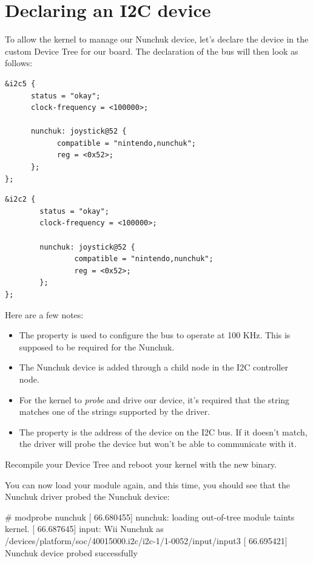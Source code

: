 \section{Declaring an I2C device}

To allow the kernel to manage our Nunchuk device, let's declare the
device in the custom Device Tree for our board. The declaration of the
\busname bus will then look as follows:

\if{}
\begin{verbatim}
&i2c5 {
      status = "okay";
      clock-frequency = <100000>;

      nunchuk: joystick@52 {
            compatible = "nintendo,nunchuk";
            reg = <0x52>;
      };
};
\end{verbatim}
\fi
\if{}
\begin{verbatim}
&i2c2 {
        status = "okay";
        clock-frequency = <100000>;

        nunchuk: joystick@52 {
                compatible = "nintendo,nunchuk";
                reg = <0x52>;
        };
};
\end{verbatim}
\fi

Here are a few notes:
\begin{itemize}
\item The  property is used to configure the bus
      to operate at 100 KHz. This is supposed to be required for the
      Nunchuk.
\item The Nunchuk device is added through a child node in the I2C
      controller node.
\item For the kernel to {\em probe} and drive our device, it's required
      that the  string matches one of the
       strings supported by the driver.
\item The  property is the address of the device on the
      I2C bus. If it doesn't match, the driver will probe the device
      but won't be able to communicate with it.
\end{itemize}

Recompile your Device Tree and reboot your kernel with the new binary.

You can now load your module again, and this time, you should see that
the Nunchuk driver probed the Nunchuk device:

\begin{bashinput}
# modprobe nunchuk
[   66.680455] nunchuk: loading out-of-tree module taints kernel.
[   66.687645] input: Wii Nunchuk as /devices/platform/soc/40015000.i2c/i2c-1/1-0052/input/input3
[   66.695421] Nunchuk device probed successfully
\end{bashinput}

